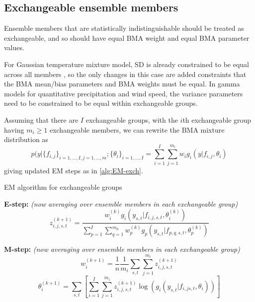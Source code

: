 \documentclass[10pt,fleqn]{article}
\begin{document}


\subsection{Exchangeable ensemble members}

Ensemble members that are statistically indistinguishable should be treated as exchangeable, and so should have equal BMA weight and equal BMA parameter values.

For Gaussian temperature mixture model, SD is already constrained to be equal across all members \cite{Raftery2005}, so the only changes in this case are added constraints that the BMA mean/bias parameters and BMA weights must be equal. In gamma models for quantitative precipitation and wind speed, the variance parameters need to be constrained to be equal within exchangeable groups.

Assuming that there are $I$ exchangeable groups, with the $i$th exchangeable group having $m_i \ge 1$ exchangeable members, we can rewrite the BMA mixture distribution as
%
\[p(y | \{f_{i,j}\}_{i=1,\dots, I, j=1, \dots, m}; \{\theta_i\}_{i=1,\dots, I}%
 = \sum_{i=1}^I \sum_{j=1}^{m_i} w_i g_i (y|f_{i,j}, \theta_i)\]
giving  updated EM steps as in \autoref{alg:EM-exch}.

\begin{algorithm}%
    \caption{EM algorithm for exchangeable groups}
    \label{alg:EM-exch}
\vspace{5pt}

\textbf{E-step:} \textit{(now averaging over ensemble members in each exchangeable group)}
%
\vspace{5pt}
\[ z_{i,j,s,t}^{(k+1)} = \frac{w_i^{(k)} g_i(y_{s,t} | f_{i,j,s,t}, \theta_i^{(k)})}%
	{\sum\limits_{p=1}^I \sum\limits_{q=1}^{m_p} w_p^{(k)} g_p(y_{s,t}|f_{p,q,s,t}, \theta_p^{(k)})}\]
%
\vspace{5pt}

\textbf{M-step:} \textit{(now averaging over ensemble members in each exchangeable group)}
%
\[ w_i^{(k+1)} = \frac{1}{n}\frac{1}{m_i}\sum_{s,t} \sum_{j=1}^{m_i} z_{i,j,s,t}^{(k+1)} \]
%
\[ \theta_i^{(k+1)} = \sum_{s, t} \left[ \sum_{i=1}^I \sum_{j=1}^{m_i} z_{i,j,s,t}^{(k+1)} \log \left( g_i(y_{s,t} | f_{i,js,t}, \theta_i) \right) \right]\]
%
\vspace{5pt}
\end{algorithm}
\end{document}
